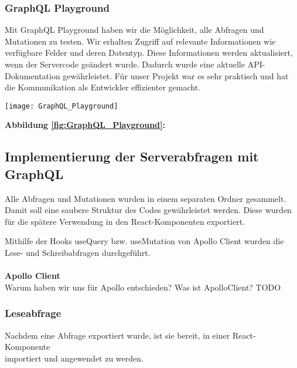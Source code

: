 \subsubsection{GraphQL Playground}
Mit GraphQL Playground haben wir die Möglichkeit, alle Abfragen und Mutationen zu testen. Wir erhalten Zugriff auf relevante Informationen wie verfügbare Felder und deren Datentyp. Diese Informationen werden aktualisiert, wenn der Servercode geändert wurde. Dadurch wurde eine aktuelle API-Dokumentation gewährleistet. Für unser Projekt war es sehr praktisch und hat die Kommunikation als Entwickler effizienter gemacht.
\\
\begin{center}
  \texttt{[image: GraphQL\_Playground]}\label{fig:GraphQL_Playground}
\end{center}
\textbf{Abbildung \autoref{fig:GraphQL_Playground}:}
\newpage

\subsection{Implementierung der Serverabfragen mit GraphQL}
Alle Abfragen und Mutationen wurden in einem separaten Ordner gesammelt.
Damit soll eine saubere Struktur des Codes gewährleistet werden.
Diese wurden für die spätere Verwendung in den React-Komponenten exportiert.

Mithilfe der Hooks useQuery bzw. useMutation von Apollo Client wurden die Lese- und Schreibabfragen durchgeführt.
\\\\
\textbf{Apollo Client}\\
Warum haben wir uns für Apollo entschieden? Was ist ApolloClient?
TODO
\newpage

\subsubsection{Leseabfrage}
Nachdem eine Abfrage exportiert wurde, ist sie bereit, in einer React-Komponente \\
importiert und angewendet zu werden.

